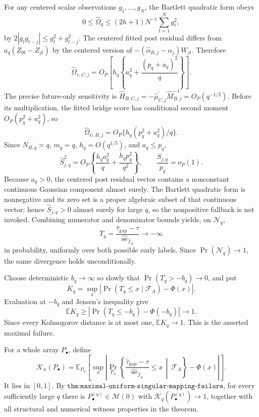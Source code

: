 For any centered scalar observations \(g_1,\ldots,g_N\), the Bartlett quadratic form obeys
\[
 0\leq\widehat\Omega_g\leq(2h+1)N^{-1}\sum_{t=1}^Ng_t^2,
\]
by \(2|g_tg_{t-j}|\leq g_t^2+g_{t-j}^2\).  The centered fitted post residual differs from \(a_q(Z_{0t}-Z_{jt})\) by the centered version of \(-(\widehat\alpha_{B,j}-\alpha_j)W_{jt}\).  Therefore
\[
 \widehat\Omega_{v,C,j}
 =O_P\left[h_q\left\{a_q^2+\frac{(p_q+a_q)^2}{q}\right\}\right].
\]
The precise future-only sensitivity is \(\widehat H_{B,C,j}=-\widehat\mu_{C,j}^{\prime}\widehat M_{B,j}^{-1}=O_P(q^{-1/2})\).  Before its multiplication, the fitted bridge score has conditional second moment \(O_P(p_q^2+a_q^2)\), so
\[
 \widehat\Omega_{\psi,B,j}=O_P\{h_q(p_q^2+a_q^2)/q\}.
\]
Since \(N_{B,q}\asymp q\), \(m_q=q\), \(h_q=O(q^{1/5})\), and \(a_q\leq p_q\),
\[
 \widehat S_{j,q}^2
 =O_P\left\{\frac{h_qa_q^2}{q}+\frac{h_qp_q^2}{q^2}\right\},
 \qquad
 \frac{\widehat S_{j,q}}{p_q}=o_P(1).
\]
Because \(a_q>0\), the centered post residual vector contains a nonconstant continuous Gaussian component almost surely.  The Bartlett quadratic form is nonnegative and its zero set is a proper algebraic subset of that continuous vector; hence \(\widehat S_{j,q}>0\) almost surely for large \(q\), so the nonpositive fallback is not invoked.  Combining numerator and denominator bounds yields, on \(\mathcal N_q\),
\[
 T_q=\frac{\widehat\tau_{\mathrm{gap}}-\tau}
 {\widehat{\operatorname{se}}_{\widehat J_A}}\to-\infty
\]
in probability, uniformly over both possible early labels.  Since \(\Pr(\mathcal N_q)\to1\), the same divergence holds unconditionally.

Choose deterministic \(b_q\to\infty\) so slowly that \(\Pr(T_q>-b_q)\to0\), and put
\[
 K_q=\sup_x\left|\Pr(T_q\leq x\mid\mathcal F_A)-\Phi(x)\right|.
\]
Evaluation at \(-b_q\) and Jensen's inequality give
\[
 \mathbb EK_q\geq
 \left|\Pr(T_q\leq-b_q)-\Phi(-b_q)\right|\to1.
\]
Since every Kolmogorov distance is at most one, \(\mathbb EK_q\to1\).  This is the asserted maximal failure.

For a whole array \(P_\bullet\), define
\[
 \mathcal K_n(P_\bullet)=
 \mathbb E_{P_n}\left[
  \sup_x\left|
   \Pr_{P_n}\left\{
    \frac{\widehat\tau_{\mathrm{gap}}-\tau}
         {\widehat{\operatorname{se}}_{\widehat J_A}}
    \leq x\,\middle|\,\mathcal F_A
   \right\}-\Phi(x)
  \right|
 \right].
\]
It lies in \([0,1]\).  By \(\texttt{thm:maximal-uniform-singular-mapping-failure}\), for every sufficiently large \(q\) there is \(P_\bullet^{(q)}\in\mathcal M(0)\) with \(\mathcal K_q(P_\bullet^{(q)})\to1\), together with all structural and numerical witness properties in the theorem.

